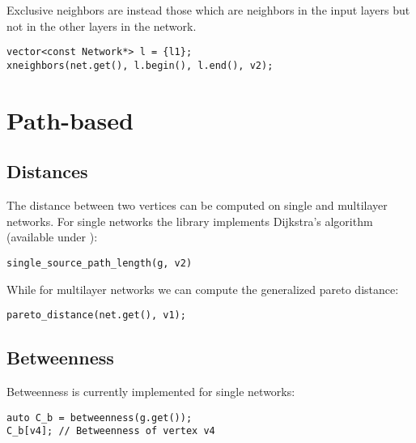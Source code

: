 Exclusive neighbors are instead those which are neighbors in the input layers but not in the other layers in the network.
\begin{lstlisting}[style=c++] 
vector<const Network*> l = {l1};
xneighbors(net.get(), l.begin(), l.end(), v2);
\end{lstlisting}

\section{Path-based}

\subsection{Distances}

The distance between two vertices can be computed on single and multilayer networks. For single networks the library implements Dijkstra's algorithm (available under ):
\begin{lstlisting}[style=c++] 
single_source_path_length(g, v2)
\end{lstlisting}

While for multilayer networks we can compute the generalized pareto distance:
\begin{lstlisting}[style=c++] 
pareto_distance(net.get(), v1);
\end{lstlisting}




    
\subsection{Betweenness}

Betweenness is currently implemented for single networks:
\begin{lstlisting}[style=c++]
auto C_b = betweenness(g.get());
C_b[v4]; // Betweenness of vertex v4
\end{lstlisting}

